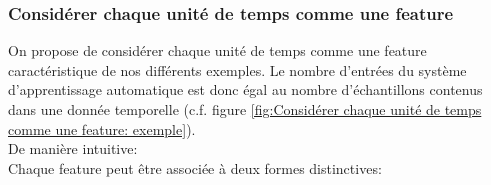 \subsubsection{Considérer chaque unité de temps comme une feature}
\label{Automatisation du processus d'investigation: Reconnaissance de motifs: Différentes approches étudiées: Considérer chaque unité de temps comme une feature}
On propose de considérer chaque unité de temps comme une feature caractéristique de nos différents exemples. Le nombre d'entrées du système d'apprentissage automatique est donc égal au nombre d'échantillons contenus dans une donnée temporelle (c.f. figure \ref{fig:Considérer chaque unité de temps comme une feature: exemple}). \\
De manière intuitive: \\
Chaque feature peut être associée à deux formes distinctives: 
